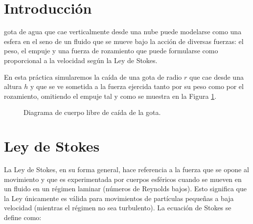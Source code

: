 \documentclass[journal]{IEEEtran}
\begin{document}
%
\IEEEpeerreviewmaketitle

\section{Introducción}

 gota de agua que cae verticalmente desde una nube puede modelarse como una esfera en el seno de un fluido que se mueve bajo la acción de diversas fuerzas: el peso, el empuje y una fuerza de rozamiento que puede formularse como proporcional a la velocidad según la Ley de Stokes.

En esta práctica simularemos la caída de una gota de radio $r$ que cae desde una altura $h$ y que se ve sometida a la fuerza ejercida tanto por su peso como por el rozamiento, omitiendo el empuje tal y como se muestra en la Figura \ref{fig:gota}.

\begin{figure}[!htb]
  \centering
  \caption{Diagrama de cuerpo libre de caída de la gota.}
  \label{fig:gota}
\end{figure}

\section{Ley de Stokes}

La Ley de Stokes, en su forma general, hace referencia a la fuerza que se opone al movimiento y que es experimentada por cuerpos esféricos cuando se mueven en un fluido en un régimen laminar (números de Reynolds bajos). Esto significa que la Ley únicamente es válida para movimientos de partículas pequeñas a baja velocidad (mientras el régimen no sea turbulento). La ecuación de Stokes se define como:
\end{document}
